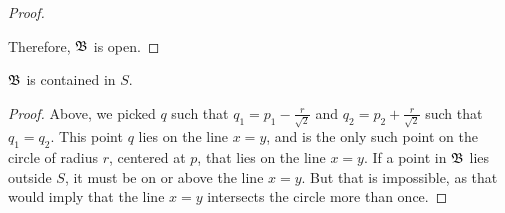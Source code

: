 \begin{answer}
\begin{claim}
\begin{proof}
\begin{enumarabic}
      \end{enumarabic}
      Therefore, $\mathfrak{B}$ is open.

    \end{proof}
  \end{claim}

  \newpage
  \begin{claim}
    $\mathfrak{B}$ is contained in $S$.

    \begin{proof}
      Above, we picked $q$ such that $q_1 = p_1 - \frac{r}{\sqrt{2}}$ and $q_2 = p_2 + \frac{r}{\sqrt{2}}$
      such that $q_1 = q_2$. This point $q$ lies on the line $x = y$,
      and is the only such point on the circle of radius $r$, centered at $p$, that lies on the line $x = y$.
      If a point in $\mathfrak{B}$ lies outside $S$, it must be on or above the line $x = y$.
      But that is impossible, as that would imply that the line $x = y$ intersects the circle
      more than once.

    \end{proof}
  \end{claim}
\end{answer}

